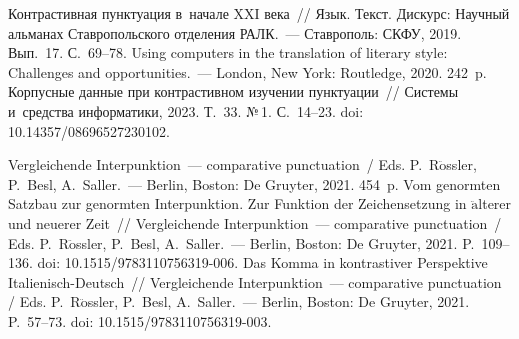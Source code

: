 \begin{multicols}{2}
{{\begin{thebibliography}{99}
 Контрастивная пунктуация в~начале XXI века~// Язык. Текст. Дискурс: 
Научный альманах Ставропольского отделения РАЛК.~--- Ставрополь: СКФУ, 
2019.  Вып.~17. С.~69--78.
 Using computers in the translation of literary style: Challenges and 
opportunities.~--- London, New York: Routledge, 2020. 242~p.
 Корпусные данные при контрастивном изуче\-нии 
пунктуации~// Сис\-те\-мы и~средства информатики, 2023. Т.~33. №\,1. С.~14--23. doi: 10.14357/08696527230102.

Vergleichende Interpunktion~--- comparative punctuation~/ Eds. P.~R$\ddot{\mbox{o}}$ssler, P.~Besl, A.~Saller.~--- 
Berlin, Boston: De Gruyter, 2021. 454~p.
 Vom genormten Satzbau zur genormten Interpunktion. Zur Funktion der 
Zeichensetzung in $\ddot{\mbox{a}}$lterer und neuerer Zeit~// Vergleichende Interpunktion~--- comparative 
punctuation~/ Eds. P.~R$\ddot{\mbox{o}}$ssler, P.~Besl, A.~Saller.~---
 Berlin, Boston: De Gruyter, 2021. P.~109--136. doi: 10.1515/9783110756319-006.
 Das Komma in kontrastiver Perspektive Italienisch-Deutsch~// Vergleichende Interpunktion~--- 
comparative punctuation / Eds. P.~R$\ddot{\mbox{o}}$ssler, P.~Besl, 
A.~Saller.~--- Berlin, Boston: De Gruyter, 2021. P.~57--73. doi: 10.1515/9783110756319-003.

\columnbreak


\end{thebibliography}}}
\end{multicols}
